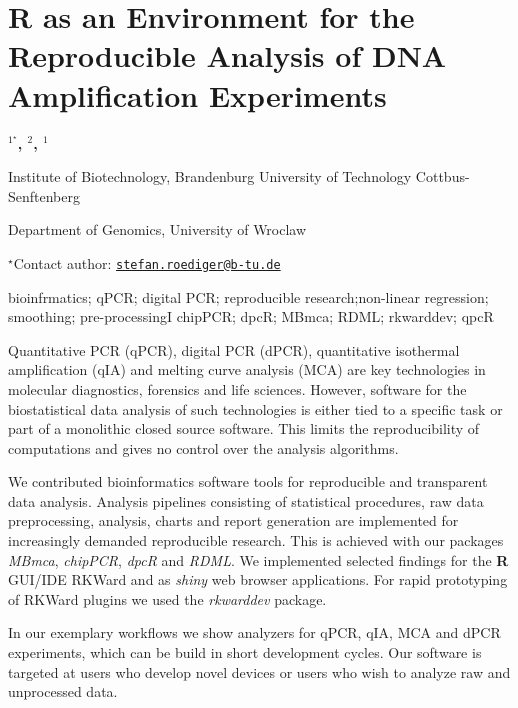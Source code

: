 \documentclass[\main/boa.tex]{subfiles}
\begin{document}
\section{R as an Environment for the Reproducible Analysis of DNA Amplification
Experiments}

\begin{center}
  {\bf {}$^{1^\star}$, $^{2}$, $^{1}$}
\end{center}

\vskip 0.3cm

\begin{affiliations}
\begin{enumerate}
\begin{minipage}{0.915\textwidth}
\centering
\item Institute of Biotechnology, Brandenburg University of Technology
Cottbus-Senftenberg \\[-2pt]
\item Department of Genomics, University of Wroclaw \\[-2pt]
\end{minipage}
\end{enumerate}
$^\star$Contact author: \href{mailto:stefan.roediger@b-tu.de}{\nolinkurl{stefan.roediger@b-tu.de}}\\
\end{affiliations}

\vskip 0.5cm

\begin{minipage}{0.915\textwidth}
\keywords bioinfrmatics; qPCR; digital PCR; reproducible research;non-linear
regression; smoothing; pre-processingI
\packages chipPCR; dpcR; MBmca; RDML; rkwarddev; qpcR
\end{minipage}

\vskip 0.8cm

Quantitative PCR (qPCR), digital PCR (dPCR), quantitative isothermal
amplification (qIA) and melting curve analysis (MCA) are key
technologies in molecular diagnostics, forensics and life sciences.
However, software for the biostatistical data analysis of such
technologies is either tied to a specific task or part of a monolithic
closed source software. This limits the reproducibility of computations
and gives no control over the analysis algorithms.

We contributed bioinformatics software tools for reproducible and
transparent data analysis. Analysis pipelines consisting of statistical
procedures, raw data preprocessing, analysis, charts and report
generation are implemented for increasingly demanded reproducible
research. This is achieved with our packages \emph{MBmca},
\emph{chipPCR}, \emph{dpcR} and \emph{RDML}. We implemented selected
findings for the \textbf{R} GUI/IDE RKWard and as \emph{shiny} web
browser applications. For rapid prototyping of RKWard plugins we used
the \emph{rkwarddev} package.

In our exemplary workflows we show analyzers for qPCR, qIA, MCA and dPCR
experiments, which can be build in short development cycles. Our
software is targeted at users who develop novel devices or users who
wish to analyze raw and unprocessed data.
\end{document}
